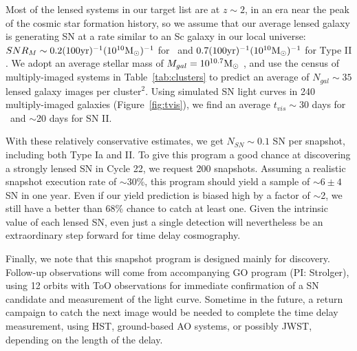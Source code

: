 Most of the lensed systems in our target list are at $z\sim 2$, in an
era near the peak of the cosmic star formation history, so we assume
that our average lensed galaxy is generating SN at a rate similar to
an Sc galaxy in our local universe: $SNR_{M} \sim0.2
(100 \mbox{yr})^{-1} (10^{10} \mbox{M$_{\odot}$})^{-1}$ for \SNIa\ and $0.7
(100 \mbox{yr})^{-1} (10^{10} \mbox{M$_{\odot}$})^{-1}$ for Type
II \citep{Mannucci:2005}.  We adopt an average stellar mass of
$M_{gal}=10^{10.7} \mbox{M$_{\odot}$}$ \citep{Tomczak:2014}, and use the census of
multiply-imaged systems in Table~\ref{tab:clusters} to predict an
average of $N_{gal}\sim 35$ lensed galaxy images per
cluster$^{2}$.  Using simulated SN light curves in 240 multiply-imaged
galaxies (Figure~\ref{fig:tvis}), we find an average $t_{vis}\sim 30$
days for \SNIa\ and $\sim$20 days for SN II.


With these relatively conservative estimates, we get $N_{SN}\sim
0.1$ SN per snapshot, including both Type Ia and II.  To give this
program a good chance at discovering a strongly lensed SN in Cycle 22,
we request 200 snapshots.  Assuming a realistic snapshot execution
rate of $\sim$30\%, this program should yield a sample of $\sim 6 \pm
4$ SN in one year.  Even if our yield prediction is biased high by a
factor of $\sim$2, we still have a better than 68\% chance to catch at
least one.  Given the intrinsic value of each lensed SN, even just a
single detection will nevertheless be an extraordinary step forward
for time delay cosmography.

Finally, we note that this snapshot program is designed mainly for
discovery. Follow-up observations will come from accompanying GO
program (PI: Strolger), using 12 orbits with ToO observations for immediate
confirmation of a SN candidate and measurement of the light curve.
Sometime in the future, a return campaign to catch the next image
would be needed to complete the time delay measurement, using HST,
ground-based AO systems, or possibly JWST, depending on the length of
the delay.









